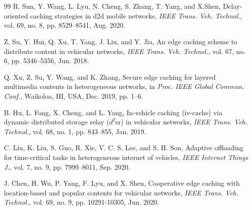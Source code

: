 \documentclass{article}
\begin{document}
\section{ }

\section{ }
\begin{frame}
\frametitle{ }
\begin{block}{}
\begin{minipage}{1\linewidth}
\scriptsize{
\begin{thebibliography}{99} %
 R. Sun, Y. Wang, L. Lyu, N. Cheng, S. Zhang, T. Yang, and X.Shen, Delay-oriented caching strategies in d2d mobile networks,  \emph{IEEE Trans. Veh. Technol.}, vol. 69, no. 8, pp. 8529--8541, Aug. 2020.
\item Z. Su, Y. Hui, Q. Xu, T. Yang, J. Liu, and Y. Jia, An edge caching scheme to distribute content in vehicular networks,  \emph{IEEE Trans. Veh. Technol.}, vol. 67, no. 6, pp. 5346--5356, Jun. 2018.
\item Q. Xu, Z. Su, Y. Wang, and K. Zhang, Secure edge caching for layered multimedia contents in heterogeneous networks,  in \emph{Proc. IEEE Global Commun. Conf.}, Waikoloa, HI, USA, Dec. 2019, pp. 1--6.
\item B. Hu, L. Fang, X. Cheng, and L. Yang, In-vehicle caching (iv-cache) via dynamic distributed storage relay ($d^2$sr) in vehicular networks,  \emph{IEEE Trans. Veh. Technol.}, vol. 68, no. 1, pp. 843--855, Jan. 2019.
\item C. Liu, K. Liu, S. Guo, R. Xie, V. C. S. Lee, and S. H. Son, Adaptive offloading for time-critical tasks in heterogeneous internet of vehicles,  \emph{IEEE Internet Things J.}, vol. 7, no. 9, pp. 7999--8011, Sep. 2020.
\item J. Chen, H. Wu, P. Yang, F. Lyu, and X. Shen, Cooperative edge caching with location-based and popular contents for vehicular networks,  \emph{IEEE Trans. Veh. Technol.}, vol. 69, no. 9, pp. 10291-10305, Jun. 2020.
\end{thebibliography}
}
\end{minipage}
\end{block}
\end{frame}
\end{document}
